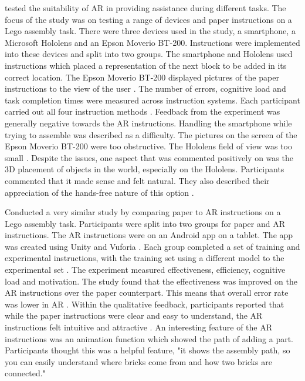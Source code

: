 \documentclass{l4proj}
\begin{document}
\citet{blattgerste_comparing_2017} tested the suitability of AR in providing assistance during different tasks. The focus of the study was on testing a range of devices and paper instructions on a Lego assembly task. There were three devices used in the study, a smartphone, a Microsoft Hololens and an Epson Moverio BT-200. Instructions were implemented into these devices and split into two groups. The smartphone and Hololens used instructions which placed a representation of the next block to be added in its correct location. The Epson Moverio BT-200 displayed pictures of the paper instructions to the view of the user \citep{blattgerste_comparing_2017}. The number of errors, cognitive load and task completion times were measured across instruction systems. Each participant carried out all four instruction methods \citep{blattgerste_comparing_2017}. Feedback from the experiment was generally negative towards the AR instructions. Handling the smartphone while trying to assemble was described as a difficulty. The pictures on the screen of the Epson Moverio BT-200 were too obstructive. The Hololens field of view was too small \citep{blattgerste_comparing_2017}. Despite the issues, one aspect that was commented positively on was the 3D placement of objects in the world, especially on the Hololens. Participants commented that it made sense and felt natural. They also described their appreciation of the hands-free nature of this option \citep{blattgerste_comparing_2017}. 

\citet{yang_comparing_2020} Conducted a very similar study by comparing paper to AR instructions on a Lego assembly task. Participants were split into two groups for paper and AR instructions. The AR instructions were on an Android app on a tablet. The app was created using Unity and Vuforia \citep{yang_comparing_2020}. Each group completed a set of training and experimental instructions, with the training set using a different model to the experimental set \citep{yang_comparing_2020}. The experiment measured effectiveness, efficiency, cognitive load and motivation. The study found that the effectiveness was improved on the AR instructions over the paper counterpart. This means that overall error rate was lower in AR \citep{yang_comparing_2020}. Within the qualitative feedback, participants reported that while the paper instructions were clear and easy to understand, the AR instructions felt intuitive and attractive \citep{yang_comparing_2020}. An interesting feature of the AR instructions was an animation function which showed the path of adding a part. Participants thought this was a helpful feature, "it shows the assembly path, so you can easily understand where bricks come from and how two bricks are connected." \citep{yang_comparing_2020}
\end{document}
